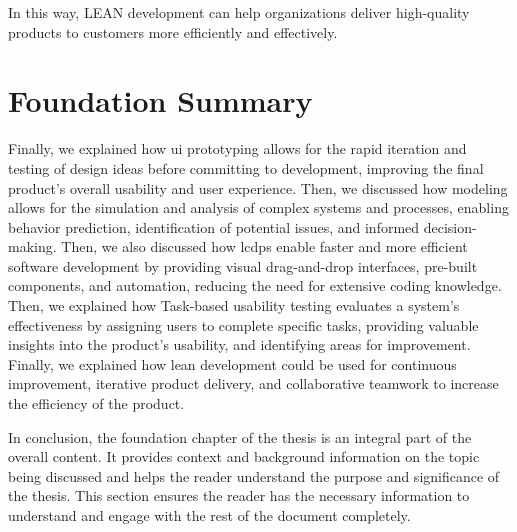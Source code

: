 In this way, LEAN development can help organizations deliver high-quality products to customers more efficiently and effectively.
\clearpage
\section{Foundation Summary}
Finally, we explained how \ac{ui} prototyping allows for the rapid iteration and testing of design ideas before committing to development, improving the final product's overall usability and user experience.
Then, we discussed how modeling allows for the simulation and analysis of complex systems and processes, enabling behavior prediction, identification of potential issues, and informed decision-making.
Then, we also discussed how \ac{lcdp}s enable faster and more efficient software development by providing visual drag-and-drop interfaces, pre-built components, and automation, reducing the need for extensive coding knowledge.
Then, we explained how Task-based usability testing evaluates a system's effectiveness by assigning users to complete specific tasks, providing valuable insights into the product's usability, and identifying areas for improvement.
Finally, we explained how lean development could be used for continuous improvement, iterative product delivery, and collaborative teamwork to increase the efficiency of the product.

In conclusion, the foundation chapter of the thesis is an integral part of the overall content. 
It provides context and background information on the topic being discussed and helps the reader understand the purpose and significance of the thesis. 
This section ensures the reader has the necessary information to understand and engage with the rest of the document completely.
\clearpage




